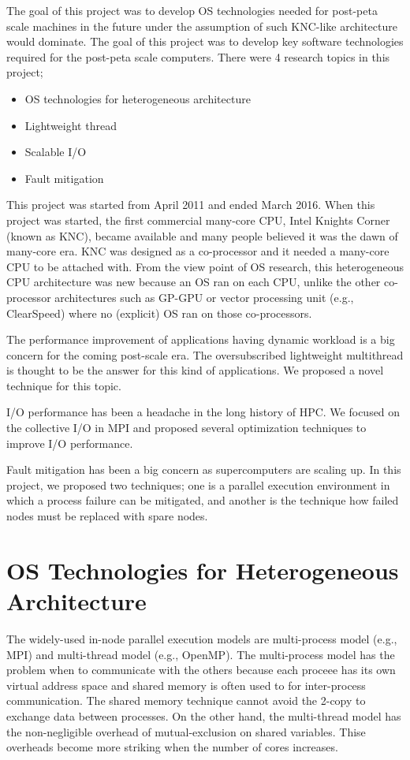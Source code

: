The goal of this project was to develop OS technologies needed for
post-peta scale machines in the future under the assumption of such
KNC-like architecture would dominate. The goal of this project was to
develop key software technologies required for the post-peta scale
computers. There were 4 research topics in this project;

\begin{itemize}
\item OS technologies for heterogeneous architecture
\item Lightweight thread
\item Scalable I/O
\item Fault mitigation
\end{itemize}

This project was started from April 2011 and ended March 2016. When
this project was started, the first commercial many-core CPU, Intel
Knights Corner (known as KNC)\cite{overview-xeon-phi}, became
available and many people 
believed it was the dawn of many-core era. KNC was designed as a
co-processor and it needed a many-core CPU to be attached with. From
the view point of OS research, this heterogeneous CPU architecture was
new because an OS ran on each CPU, unlike the other co-processor
architectures such as GP-GPU or vector processing unit (e.g.,
ClearSpeed) where no (explicit) OS ran on those co-processors. 

The performance improvement of applications having dynamic
workload is a big concern for the coming post-scale era. The
oversubscribed lightweight multithread is thought to be the answer for
this kind of applications. We proposed a novel technique for this
topic. 

I/O performance has been a headache in the long history of HPC. We
focused on the collective I/O in MPI and proposed several optimization
techniques to improve I/O performance.

Fault mitigation has been a big concern as supercomputers are scaling
up. In this project, we proposed two techniques; one is a parallel
execution environment in which a process failure can be mitigated, and
another is the technique how failed nodes must be replaced with spare
nodes. 

\section{OS Technologies for Heterogeneous Architecture}

The widely-used in-node parallel execution models are
multi-process model (e.g., MPI) and multi-thread model (e.g.,
OpenMP). The multi-process model has the problem when to communicate
with the others because each proceee has its own virtual address space
and shared memory is often used to for inter-process
communication. The shared memory technique cannot avoid the 2-copy to
exchange data between processes. On the other hand, the multi-thread
model has the non-negligible overhead of mutual-exclusion on shared
variables. Thise overheads become more striking when the number of
cores increases.  

